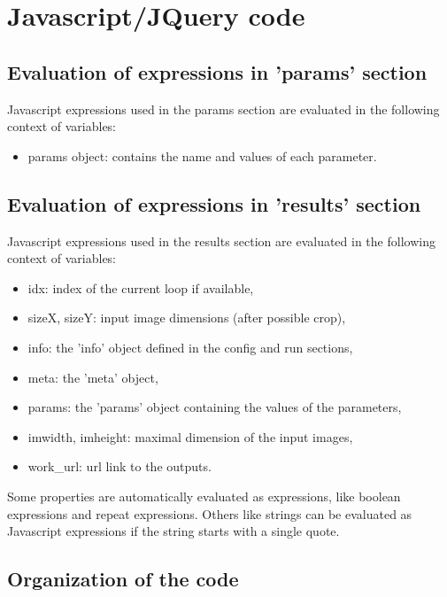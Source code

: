 \section{Javascript/JQuery code}

\subsection{Evaluation of expressions in 'params' section} \label{sec:JavascriptEvalParams}

Javascript expressions used in the params section are evaluated in the 
following context of variables:
\begin{itemize}
  \item params object: contains the name and values of each parameter.
\end{itemize}

\subsection{Evaluation of expressions in 'results' section} \label{sec:JavascriptEval}

Javascript expressions used in the results section are evaluated in the 
following context of variables:
\begin{itemize}
  \item idx: index of the current loop if available,
  \item sizeX, sizeY: input image dimensions (after possible crop),
  \item info: the 'info' object defined in the config and run sections,
  \item meta: the 'meta' object,
  \item params: the 'params' object containing the values of the parameters,
  \item imwidth, imheight: maximal dimension of the input images,
  \item work\_url: url link to the outputs.
\end{itemize}

Some properties are automatically evaluated as expressions, like boolean expressions
and repeat expressions. Others like strings can be evaluated as Javascript expressions
if the string starts with a single quote.

\subsection{Organization of the code}

